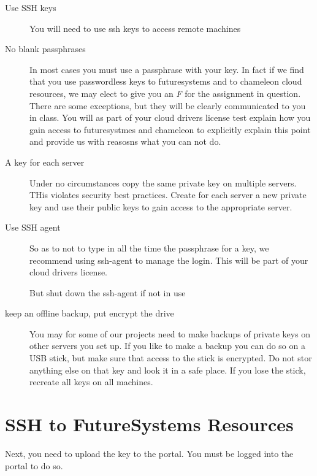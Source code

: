 \begin{description}

\item[Use SSH keys] You will need to use ssh keys to access remote machines

\item[No blank passphrases] In most cases you must use a passphrase
  with your key. In fact if we find that you use passwordless keys to
  futuresystems and to chameleon cloud resources, we may elect to give
  you an \textit{F} for the assignment in question. There are some
  exceptions, but they will be clearly communicated to you in
  class. You will as part of your cloud drivers license test explain
  how you gain access to futuresystmes and chameleon to explicitly
  explain this point and provide us with reasosns what you can not do.

\item[A key for each server] Under no circumstances copy the same
  private key on multiple servers. THis violates security best
  practices. Create for each server a new private key and use their
  public keys to gain access to the appropriate server.

\item[Use SSH agent] So as to not to type in all the time the
  passphrase for a key, we recommend using ssh-agent to manage the
  login. This will be part of your cloud drivers license.

  But shut down the ssh-agent if not in use

\item[keep an offline backup, put encrypt the drive] You may for some
  of our projects need to make backups of private keys on other
  servers you set up. If you  like to make a backup you can do so on a
  USB stick, but make sure that access to the stick is encrypted. Do
  not stor anything else on that key and look it in a safe place. If
  you lose the stick, recreate all keys on all machines.

\end{description}


\section{SSH to FutureSystems Resources}

Next, you need to upload the key to the portal. You must be logged into
the portal to do so.

